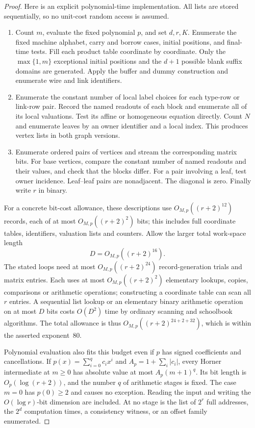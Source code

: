 \begin{proof}
Here is an explicit polynomial-time implementation. All lists are stored
sequentially, so no unit-cost random access is assumed.
\begin{enumerate}[label=\arabic*.,leftmargin=*]
\item Count $m$, evaluate the fixed polynomial $p$, and set $d,r,K$.
Enumerate the fixed machine alphabet, carry and borrow cases, initial
positions, and final-time tests. Fill each product table coordinate by
coordinate. Only the $\max\{1,m\}$ exceptional initial positions and the
$d+1$ possible blank suffix domains are generated. Apply the buffer and
dummy construction and enumerate wire and link identifiers.
\item Enumerate the constant number of local label choices for each
type-row or link-row pair. Record the named readouts of each block and
enumerate all of its local valuations. Test its affine or homogeneous
equation directly. Count $N$ and enumerate leaves by an owner identifier and
a local index. This produces vertex lists in both graph versions.
\item Enumerate ordered pairs of vertices and stream the corresponding
matrix bits. For base vertices, compare the constant number of named
readouts and their values, and check that the blocks differ. For a pair
involving a leaf, test owner incidence. Leaf--leaf pairs are nonadjacent.
The diagonal is zero. Finally write $r$ in binary.
\end{enumerate}

For a concrete bit-cost allowance, these descriptions use
$O_{M,p}((r+2)^{12})$ records, each of at most
$O_{M,p}((r+2)^2)$ bits; this includes full coordinate tables, identifiers,
valuation lists and counters. Allow the larger total work-space length
\[
 D=O_{M,p}((r+2)^{16}).
\]
The stated loops need at most $O_{M,p}((r+2)^{24})$ record-generation trials
and matrix entries. Each uses at most $O_{M,p}((r+2)^2)$ elementary lookups,
copies, comparisons or arithmetic operations; constructing a coordinate
table can scan all $r$ entries. A sequential list lookup or an elementary
binary arithmetic operation on at most $D$ bits costs $O(D^2)$ time by
ordinary scanning and schoolbook algorithms. The total allowance is thus
$O_{M,p}((r+2)^{24+2+32})$, which is within the asserted exponent~80.

Polynomial evaluation also fits this budget even if $p$ has signed
coefficients and cancellations. If $p(x)=\sum_{i=0}^q c_i x^i$ and
$A_p=1+\sum_i|c_i|$, every Horner intermediate at $m\ge0$ has absolute value
at most $A_p(m+1)^q$. Its bit length is $O_p(\log(r+2))$, and the number
$q$ of arithmetic stages is fixed. The case $m=0$ has $p(0)\ge2$ and causes
no exception. Reading the input and writing the $O(\log r)$-bit dimension
are included. At no stage is the list of $2^r$ full addresses, the
$2^d$ computation times, a consistency witness, or an offset family
enumerated.
\end{proof}


